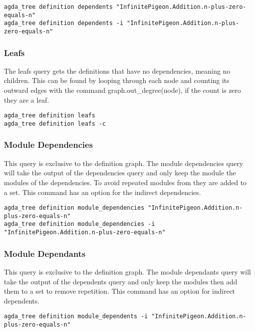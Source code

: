 \begin{lstlisting}
agda_tree definition dependents "InfinitePigeon.Addition.n-plus-zero-equals-n"
agda_tree definition dependents -i "InfinitePigeon.Addition.n-plus-zero-equals-n"
\end{lstlisting}

\subsubsection{Leafs}

The leafs query gets the definitions that have no dependencies, meaning no
children. This can be found by looping through each node and counting its
outward edges with the command \textsf{graph.out\_degree(node)}, if the count
is zero they are a leaf.

\begin{lstlisting}
agda_tree definition leafs
agda_tree definition leafs -c
\end{lstlisting}

\subsubsection{Module Dependencies}

This query is exclusive to the definition graph. The module dependencies query
will take the output of the dependencies query and only keep the module the
modules of the dependencies. To avoid repeated modules from they are added to a
set. This command has an option for the indirect dependencies.

\begin{lstlisting}
agda_tree definition module_dependencies "InfinitePigeon.Addition.n-plus-zero-equals-n"
agda_tree definition module_dependencies -i "InfinitePigeon.Addition.n-plus-zero-equals-n"
\end{lstlisting}

\subsubsection{Module Dependants}

This query is exclusive to the definition graph. The module dependants query
will take the output of the dependents query and only keep the modules then add
them to a set to remove repetition. This command has an option for indirect
dependents.

\begin{lstlisting}
agda_tree definition module_dependents -i "InfinitePigeon.Addition.n-plus-zero-equals-n"
\end{lstlisting}

